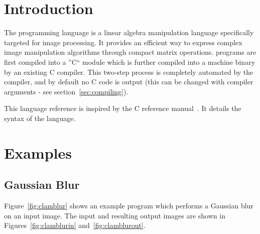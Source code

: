 \newcommand{\startsyn}{\begin{center}\begin{tabular}{l}}
\newcommand{\stopsyn}{\end{tabular}\end{center}}

\section{Introduction}
The \sys{} programming language is a linear algebra manipulation language
specifically targeted for image processing. It provides an efficient way to
express complex image manipulation algorithms through compact matrix
operations. \sys{} programs are first compiled into a ''C`` module which is
further compiled into a machine binary by an existing C compiler. This two-step
process is completely automated by the \sys{} compiler, and by default no C code
is output (this can be changed with compiler arguments - see section~\ref{sec:compiling}).

This language reference is inspired by the C reference manual~\cite{DBLP:KernighanR88}.
It details the syntax of the \sys{} language.









\clearpage
\section{Examples}

\subsection{Gaussian Blur}
Figure~\ref{fig:clamblur} shows an example \sys{} program which performs a Gaussian
blur on an input image. The input and resulting output images are shown in
Figures~\ref{fig:clamblurin} and~\ref{fig:clamblurout}.

